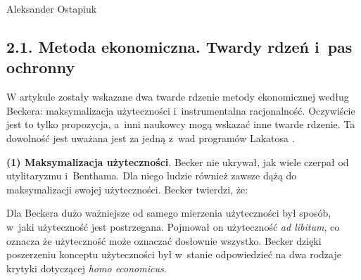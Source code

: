 \begin{artplenv}{Aleksander Ostapiuk}
\subsection{2.1. Metoda ekonomiczna. Twardy rdzeń i~pas ochronny}
W artykule zostały wskazane dwa twarde rdzenie metody ekonomicznej według Beckera: maksymalizacja
użyteczności i~instrumentalna racjonalność. Oczywiście jest to tylko propozycja, a~inni naukowcy mogą wskazać
inne twarde rdzenie. Ta
dowolność jest uważana jest za jedną z~wad programów Lakatosa
\parencite{marchi_appraising_1991}.

\textbf{(1) Maksymalizacja użyteczności}. Becker nie ukrywał, jak wiele czerpał od utylitaryzmu i~Benthama. Dla
niego ludzie również zawsze dążą do maksymalizacji swojej użyteczności. Becker twierdzi, że:


Dla Beckera dużo ważniejsze od samego mierzenia użyteczności był sposób, w~jaki użyteczność jest postrzegana. Pojmował
on użyteczność \textit{ad libitum}, co oznacza że użyteczność może oznaczać dosłownie wszystko. Becker dzięki
poszerzeniu konceptu użyteczności był w~stanie odpowiedzieć na dwa rodzaje krytyki dotyczącej \textit{homo economicus}.


\end{artplenv}
